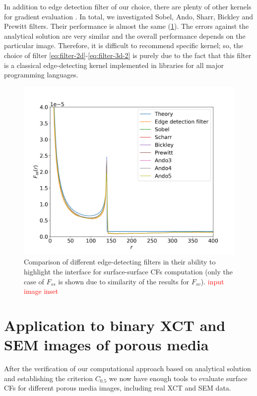 \documentclass[reprint,amsmath,amssymb,aps,pre,showkeys,showpacs]{revtex4-1}
\begin{document}
In addition to edge detection filter of our choice, there are plenty of other
kernels for gradient evaluation \cite{bickley1948,prewitt1970,ando2000}. In
total, we investigated Sobel, Ando, Sharr, Bickley and Prewitt filters. Their
performance is almost the same (\cref{fig:kernels}). The errors against the
analytical solution are very similar and the overall performance depends on the
particular image. Therefore, it is difficult to recommend specific kernel; so,
the choice of filter \cref{eq:filter-2d}-\cref{eq:filter-3d-2} is purely due to
the fact that this filter is a classical edge-detecting kernel implemented in
libraries for all major programming languages.

\begin{figure}[ht]
  \centering \includegraphics[width=\linewidth]{images/kernels.png}
  \caption{Comparison of different edge-detecting filters in their ability to
    highlight the interface for surface-surface CFs computation (only the case
    of $F_{ss}$ is shown due to similarity of the results for
    $F_{sv}$). \textcolor{red}{input image inset}}
  \label{fig:kernels}
\end{figure}

\section{Application to binary XCT and SEM images of porous media}
\label{sec:application}
After the verification of our computational approach based on analytical
solution and establishing the criterion $C_{0.5}$ we now have enough tools to
evaluate surface CFs for different porous media images, including real XCT and
SEM data.
\end{document}
